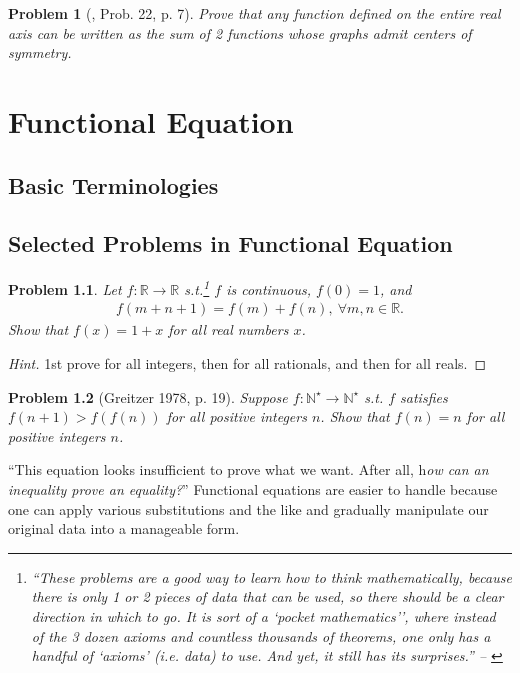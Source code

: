 \documentclass[oneside]{book}
\numberwithin{equation}{section}
\newtheorem{problem}{Problem}[section]
\begin{document}
\begin{problem}[\cite{Gelca_Andreescu2017}, Prob. 22, p. 7]
	Prove that any function defined on the entire real axis can be written as the sum of 2 functions whose graphs admit centers of symmetry.
\end{problem}


\chapter{Functional Equation}

\section{Basic Terminologies}

\section{Selected Problems in Functional Equation}
\begin{problem}
	Let $f:\mathbb{R}\to\mathbb{R}$ s.t.\footnote{``These problems are a good way to learn how to think mathematically, because there is only 1 or 2 pieces of data that can be used, so there should be a clear direction in which to go. It is sort of a `pocket mathematics'’, where instead of the 3 dozen axioms and countless thousands of theorems, one only has a handful of `axioms' (i.e. data) to use. And yet, it still has its surprises.'' -- \cite[Chap. 3, p. 36]{Tao2006}} $f$ is continuous, $f(0) = 1$, and
	\begin{align*}
		f(m + n + 1) = f(m) + f(n),\ \forall m,n\in\mathbb{R}.
	\end{align*}
	Show that $f(x) = 1 + x$ for all real numbers $x$.
\end{problem}

\begin{proof}[Hint]
	1st prove for all integers, then for all rationals, and then for all reals.
\end{proof}

\begin{problem}[Greitzer 1978, p. 19]
	Suppose $f:\mathbb{N}^\star\to\mathbb{N}^\star$ s.t. $f$ satisfies $f(n + 1) > f(f(n))$ for all positive integers $n$. Show that $f(n) = n$ for all positive integers $n$.
\end{problem}
``This equation looks insufficient to prove what we want. After all, h\textit{ow can an inequality prove an equality?}'' Functional equations are easier to handle because one can apply various substitutions and the like and gradually manipulate our original data into a manageable form.
\end{document}
